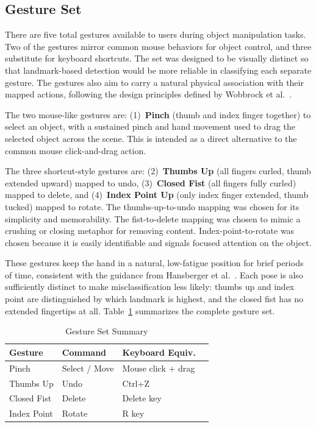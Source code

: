 \documentclass[sigconf]{acmart}
\begin{document}
\subsection{Gesture Set}

There are five total gestures available to users during object manipulation tasks. Two of the gestures mirror common mouse behaviors for object control, and three substitute for keyboard shortcuts. The set was designed to be visually distinct so that landmark-based detection would be more reliable in classifying each separate gesture. The gestures also aim to carry a natural physical association with their mapped actions, following the design principles defined by Wobbrock et al.~\cite{wobbrock2009}.

The two mouse-like gestures are: (1)~\textbf{Pinch} (thumb and index finger together) to select an object, with a sustained pinch and hand movement used to drag the selected object across the scene. This is intended as a direct alternative to the common mouse click-and-drag action.

The three shortcut-style gestures are: (2)~\textbf{Thumbs Up} (all fingers curled, thumb extended upward) mapped to undo, (3)~\textbf{Closed Fist} (all fingers fully curled) mapped to delete, and (4)~\textbf{Index Point Up} (only index finger extended, thumb tucked) mapped to rotate. The thumbs-up-to-undo mapping was chosen for its simplicity and memorability. The fist-to-delete mapping was chosen to mimic a crushing or closing metaphor for removing content. Index-point-to-rotate was chosen because it is easily identifiable and signals focused attention on the object.

These gestures keep the hand in a natural, low-fatigue position for brief periods of time, consistent with the guidance from Hansberger et al.~\cite{hansberger2017}. Each pose is also sufficiently distinct to make misclassification less likely: thumbs up and index point are distinguished by which landmark is highest, and the closed fist has no extended fingertips at all. Table~\ref{tab:gestures} summarizes the complete gesture set.

\begin{table}
  \caption{Gesture Set Summary}
  \label{tab:gestures}
  \begin{tabular}{llll}
    \toprule
    Gesture & Command & Keyboard Equiv. \\
    \midrule
    Pinch          & Select / Move    & Mouse click + drag \\
    Thumbs Up      & Undo             & Ctrl+Z \\
    Closed Fist    & Delete           & Delete key \\
    Index Point    & Rotate           & R key \\
    \bottomrule
  \end{tabular}
\end{table}
\end{document}
